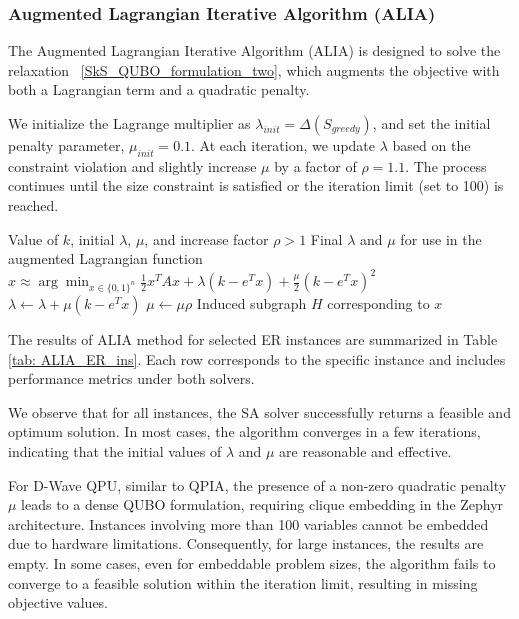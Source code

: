\documentclass{article}
\begin{document}
\subsubsection{Augmented Lagrangian Iterative Algorithm (ALIA)}

The Augmented Lagrangian Iterative Algorithm (ALIA) is designed to solve the relaxation ~\eqref{SkS_QUBO_formulation_two}, which augments the objective with both a Lagrangian term and a quadratic penalty.

We initialize the Lagrange multiplier as $\lambda_{init} = \Delta(S_{greedy})$, and set the initial penalty parameter, $\mu_{init} = 0.1$. At each iteration, we update $\lambda$ based on the constraint violation and slightly increase $\mu$ by a factor of $\rho = 1.1$. The process continues until the size constraint is satisfied or the iteration limit (set to 100) is reached.

\begin{algorithm}
    \caption{Augmented Lagrangian Iterative Algorithm for ~\eqref{SkS_problem_standard_formulation}}
    \label{alg: ALIA_algorithm}
    \begin{algorithmic}[1]
        \Require Value of $k$, initial $\lambda$, $\mu$, and increase factor $\rho > 1$
        \Ensure Final $\lambda$ and $\mu$ for use in the augmented Lagrangian function
        \Repeat
            \State $x \approx \arg \min_{x \in \{0, 1\}^n} \frac{1}{2}x^TAx + \lambda(k - e^Tx) + \frac{\mu}{2}(k - e^Tx)^2 $
                \State $\lambda \gets \lambda + \mu (k - e^Tx)$
            \EndIf
            \State $\mu \gets \mu \rho$
        \State \Return Induced subgraph $H$ corresponding to $x$
    \end{algorithmic}
\end{algorithm}


The results of ALIA method for selected  ER  instances are summarized in Table \ref{tab: ALIA_ER_ins}. Each row corresponds to the specific instance and includes performance metrics under both solvers.

We observe that for all instances, the SA solver successfully returns a feasible and optimum solution. In most cases, the algorithm converges in a few iterations, indicating that the initial values of $\lambda$ and $\mu$ are reasonable and effective.

For D-Wave QPU, similar to QPIA, the presence of a non-zero quadratic penalty $\mu$ leads to a dense QUBO formulation, requiring clique embedding in the Zephyr architecture. Instances involving more than 100 variables cannot be embedded due to hardware limitations. Consequently, for large instances, the results are empty. In some cases, even for embeddable problem sizes, the algorithm fails to converge to a feasible solution within the iteration limit, resulting in missing objective values.
\end{document}
